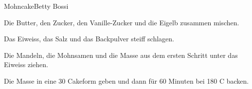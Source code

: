 
\begin{recipe}[]{Mohncake}{Betty Bossi}{}



\step
Die Butter, den Zucker, den Vanille-Zucker und die Eigelb zusammen mischen.

\step
Das Eiweiss, das Salz und das Backpulver steiff schlagen.

\step
Die Mandeln, die Mohnsamen und die Masse aus dem ersten Schritt unter das Eiweiss ziehen.

\step
Die Masse in eine 30 \cm Cakeform geben und dann f\"ur 60 Minuten bei 180 C backen.

\end{recipe}